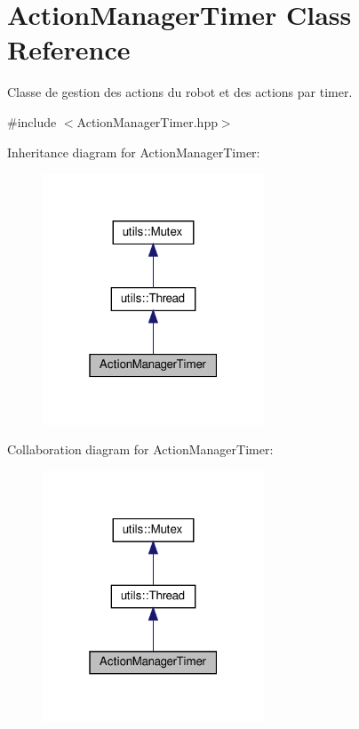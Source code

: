 \hypertarget{classActionManagerTimer}{}\section{Action\+Manager\+Timer Class Reference}
\label{classActionManagerTimer}


Classe de gestion des actions du robot et des actions par timer.  




{\ttfamily \#include $<$Action\+Manager\+Timer.\+hpp$>$}



Inheritance diagram for Action\+Manager\+Timer\+:
\nopagebreak
\begin{figure}[H]
\begin{center}
\leavevmode
\includegraphics[width=187pt]{classActionManagerTimer__inherit__graph}
\end{center}
\end{figure}


Collaboration diagram for Action\+Manager\+Timer\+:
\nopagebreak
\begin{figure}[H]
\begin{center}
\leavevmode
\includegraphics[width=187pt]{classActionManagerTimer__coll__graph}
\end{center}
\end{figure}
